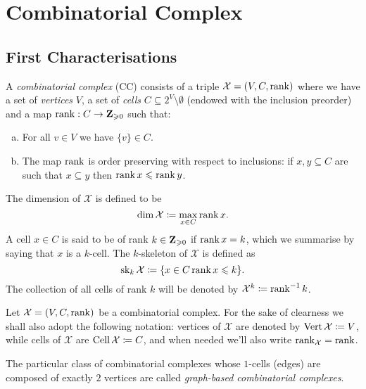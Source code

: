 \section{Combinatorial Complex}

\subsection{First Characterisations}

\begin{definition}
\label{def:combinatorial-complex}
A \emph{combinatorial complex} (CC) consists of a triple
\(\mathcal{X} = (V, C, \operatorname{rank})\) where we have a set of \emph{vertices} \(V\), a set of
\emph{cells} \(C \subseteq 2^V \setminus \emptyset\) (endowed with the inclusion preorder) and a map
\(\operatorname{rank}: C \to \mathbf{Z}_{\geqslant 0}\) such that:
\begin{enumerate}[(a)]\setlength\itemsep{0em}
\item For all \(v \in V\) we have \(\{v\} \in C\).
\item The map \(\operatorname{rank}\) is order preserving with respect to inclusions: if \(x,
  y \subseteq C\) are such that \(x \subseteq y\) then \(\operatorname{rank} x \leqslant \operatorname{rank} y\).
\end{enumerate}
The dimension of \(\mathcal{X}\) is defined to be
\[
\dim \mathcal{X} \coloneq \max_{x \in C} \operatorname{rank} x.
\]
A cell \(x \in C\) is said to be of rank \(k \in \mathbf{Z}_{\geqslant 0}\) if \(\operatorname{rank} x = k\), which we
summarise by saying that \(x\) is a \(k\)-cell. The \(k\)-skeleton of \(\mathcal{X}\) is
defined as
\[
\operatorname{sk}_k \mathcal{X} \coloneq \{x \in C \relax \operatorname{rank} x \leqslant k\}.
\]
The collection of all cells of rank \(k\) will be denoted by
\(\mathcal{X}^k \coloneq \operatorname{rank}^{-1} k\).
\end{definition}

\begin{notation}
\label{not:notation-combinatorial-complex}
Let \(\mathcal X = (V, C, \operatorname{rank})\) be a combinatorial complex. For the sake of
clearness we shall also adopt the following notation: vertices of
\(\mathcal{X}\) are denoted by \(\operatorname{Vert} \mathcal{X} \coloneq V\), while cells of
\(\mathcal{X}\) are \(\operatorname{Cell} \mathcal{X} \coloneq C\), and when needed we'll also write
\(\operatorname{rank}_{\mathcal{X}} = \operatorname{rank}\).
\end{notation}

\begin{example}
\label{exp:graph-based-cc}
The particular class of combinatorial complexes whose \(1\)-cells (edges) are
composed of exactly \(2\) vertices are called \emph{graph-based combinatorial
  complexes}.
\end{example}

